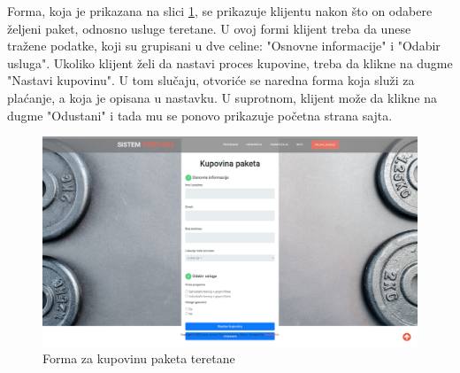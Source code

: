 \documentclass[../main.tex]{subfiles}
\begin{document}
Forma, koja je prikazana na slici \ref{fig:teretana}, se prikazuje klijentu nakon što on odabere željeni paket, odnosno usluge teretane. U ovoj formi klijent treba da unese tražene podatke, koji su grupisani u dve celine: "Osnovne informacije" i "Odabir usluga". Ukoliko klijent želi da nastavi proces kupovine, treba da klikne na dugme "Nastavi kupovinu". U tom slučaju, otvoriće se naredna forma koja služi za plaćanje, a koja je opisana u nastavku. U suprotnom, klijent može da klikne na dugme "Odustani" i tada mu se ponovo prikazuje početna strana sajta.

\begin{figure}[!ht]
\begin{center}
\includegraphics[scale=0.22]{sections/korisnicki_interfejs/screenshots/odabir_paketa_za_teretanu.png}
\end{center}

\caption{Forma za kupovinu paketa teretane}
\label{fig:teretana}
\end{figure}
\end{document}
